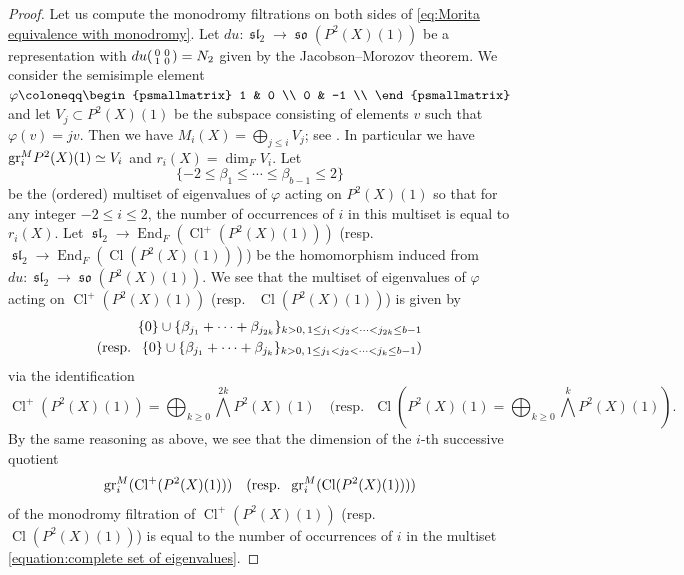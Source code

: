 \documentclass[12pt,reqno]{amsart}
\theoremstyle{definition}
\newcommand\End{\mathop{\mathrm{End}}\nolimits}
\newcommand\gr{\text{\rm gr}}
\newcommand\Cl{\mathop{\mathrm{Cl}}\nolimits}
\newcommand{\fsl}{\mathop{\mathfrak{sl}}\nolimits}
\newcommand\so{\mathop{\mathfrak{so}}\nolimits}
\numberwithin{equation}{section}
\begin{document}
\begin{proof}
Let us compute the monodromy filtrations on both sides of \eqref{eq:Morita equivalence with monodromy}.
Let $du \colon \fsl_2 \to \so(P^2(X)(1))$ be a representation
with $du\begin{psmallmatrix}
0 & 0 \\
1 & 0 \\
\end{psmallmatrix}=N_2$ given by the Jacobson--Morozov theorem.
We consider the semisimple element
$\varphi\coloneqq \begin{psmallmatrix}
1 & 0 \\
0 & -1 \\
\end{psmallmatrix}$
and let $V_j \subset P^2(X)(1)$ be the subspace consisting of elements $v$ such that $\varphi(v)=jv$.
Then we have $M_i(X) = \bigoplus_{j \leq i} V_j$; see \cite[(1.6.8)]{WeilII}.
In particular we have $\gr^M_iP^2(X)(1) \simeq V_i$ and
$r_i(X)=\dim_F V_i$.
Let
\[
\{-2 \leq \beta_{1}\leq \cdots\leq \beta_{b-1} \leq 2\}
\]
be
the (ordered) multiset of eigenvalues of $\varphi$ acting on $P^2(X)(1)$ so that for any integer $-2 \leq i \leq 2$, the number of occurrences of $i$ in this multiset is equal to $r_i(X)$.
Let 
$\fsl_2 \to \End_F(\Cl^+(P^2(X)(1)))$
(resp.~ $\fsl_2 \to \End_F(\Cl(P^2(X)(1)))$)
be the homomorphism induced from 
$du \colon \fsl_2 \to \so(P^2(X)(1))$.
We see that the multiset of eigenvalues of $\varphi$ acting on $\Cl^{+}(P^2(X)(1))$ (resp.~ $\Cl(P^2(X)(1))$) is given by
\begin{equation}\label{equation:complete set of eigenvalues}
\begin{aligned}
\{ 0 \} \cup \{ \beta_{j_1}+ \cdots +\beta_{j_{2k}}\}_{k > 0, \,
1 \leq j_1< j_2 < \cdots < j_{2k} \leq b-1} \\
(\textup{resp.~ } \{ 0 \} \cup \{ \beta_{j_1} + \cdots +\beta_{j_{k}}\}_{k > 0, \, 1 \leq j_1 < j_2 < \cdots < j_{k} \leq b-1})
\end{aligned}
\end{equation}
via the identification
\[
\Cl^+(P^2(X)(1)) = \bigoplus_{k \geq 0}\bigwedge^{2k} P^2(X)(1) \quad (\text{resp.~ } \Cl(P^2(X)(1) = \bigoplus_{k \geq 0} \bigwedge^k P^2(X)(1)).
\]
By the same reasoning as above, we see that the dimension of the $i$-th successive quotient
\[
\mathrm{gr}^M_i(\Cl^+(P^2(X)(1))) \quad (\textup{resp.~ } \mathrm{gr}^M_i(\Cl(P^2(X)(1))))
\]
of the monodromy filtration of $\Cl^+(P^2(X)(1))$
(resp.~ $\Cl(P^2(X)(1))$) is equal to the number of occurrences of $i$ in the multiset \eqref{equation:complete set of eigenvalues}.


\end{proof}
\end{document}

